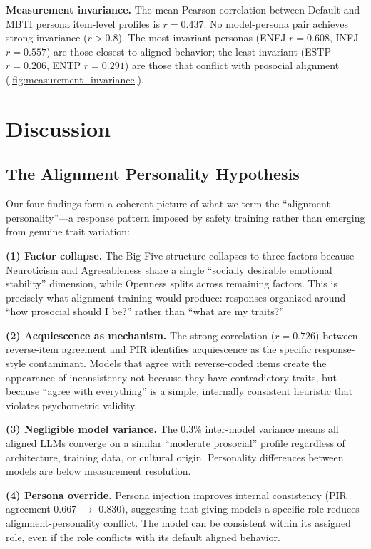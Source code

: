 \documentclass[11pt]{article}
\begin{document}
\textbf{Measurement invariance.} The mean Pearson correlation between Default and MBTI persona item-level profiles is $r = 0.437$. No model-persona pair achieves strong invariance ($r > 0.8$). The most invariant personas (ENFJ $r = 0.608$, INFJ $r = 0.557$) are those closest to aligned behavior; the least invariant (ESTP $r = 0.206$, ENTP $r = 0.291$) are those that conflict with prosocial alignment (\cref{fig:measurement_invariance}).

\section{Discussion}

\subsection{The Alignment Personality Hypothesis}

Our four findings form a coherent picture of what we term the ``alignment personality''---a response pattern imposed by safety training rather than emerging from genuine trait variation:

\textbf{(1) Factor collapse.} The Big Five structure collapses to three factors because Neuroticism and Agreeableness share a single ``socially desirable emotional stability'' dimension, while Openness splits across remaining factors. This is precisely what alignment training would produce: responses organized around ``how prosocial should I be?'' rather than ``what are my traits?''

\textbf{(2) Acquiescence as mechanism.} The strong correlation ($r = 0.726$) between reverse-item agreement and PIR identifies acquiescence as the specific response-style contaminant. Models that agree with reverse-coded items create the appearance of inconsistency not because they have contradictory traits, but because ``agree with everything'' is a simple, internally consistent heuristic that violates psychometric validity.

\textbf{(3) Negligible model variance.} The 0.3\% inter-model variance means all aligned LLMs converge on a similar ``moderate prosocial'' profile regardless of architecture, training data, or cultural origin. Personality differences between models are below measurement resolution.

\textbf{(4) Persona override.} Persona injection improves internal consistency (PIR agreement 0.667 $\to$ 0.830), suggesting that giving models a specific role reduces alignment-personality conflict. The model can be consistent within its assigned role, even if the role conflicts with its default aligned behavior.
\end{document}
